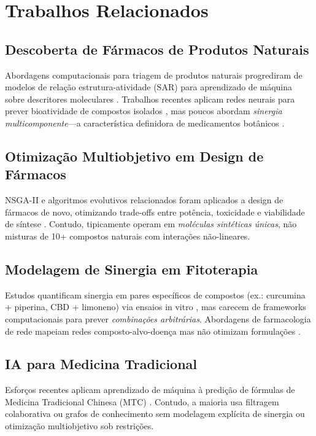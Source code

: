 \documentclass[11pt,a4paper]{article}
\begin{document}
\section{Trabalhos Relacionados}

\subsection{Descoberta de Fármacos de Produtos Naturais}

Abordagens computacionais para triagem de produtos naturais progrediram de modelos de relação estrutura-atividade (SAR) para aprendizado de máquina sobre descritores moleculares \cite{Chen2018}. Trabalhos recentes aplicam redes neurais para prever bioatividade de compostos isolados \cite{Sterling2015}, mas poucos abordam \textit{sinergia multicomponente}—a característica definidora de medicamentos botânicos \cite{Wagner2011,Williamson2001}.

\subsection{Otimização Multiobjetivo em Design de Fármacos}

NSGA-II e algoritmos evolutivos relacionados foram aplicados a design de fármacos de novo, otimizando trade-offs entre potência, toxicidade e viabilidade de síntese \cite{Deb2002,Nicolaou2009}. Contudo, tipicamente operam em \textit{moléculas sintéticas únicas}, não misturas de 10+ compostos naturais com interações não-lineares.

\subsection{Modelagem de Sinergia em Fitoterapia}

Estudos quantificam sinergia em pares específicos de compostos (ex.: curcumina + piperina, CBD + limoneno) via ensaios in vitro \cite{Russo2011,Ferber2020}, mas carecem de frameworks computacionais para prever \textit{combinações arbitrárias}. Abordagens de farmacologia de rede mapeiam redes composto-alvo-doença mas não otimizam formulações \cite{Hopkins2008,Li2014}.

\subsection{IA para Medicina Tradicional}

Esforços recentes aplicam aprendizado de máquina à predição de fórmulas de Medicina Tradicional Chinesa (MTC) \cite{Liang2022,Wang2023TCM}. Contudo, a maioria usa filtragem colaborativa ou grafos de conhecimento sem modelagem explícita de sinergia ou otimização multiobjetivo sob restrições.
\end{document}
